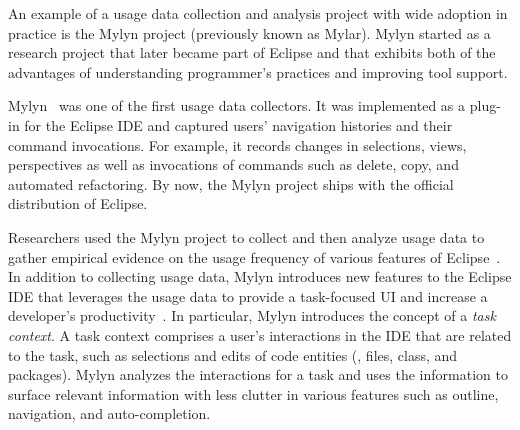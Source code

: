 An example of a usage data collection and analysis project with wide adoption
in practice is the Mylyn project (previously known as Mylar). Mylyn started as a research project that later became part of Eclipse and that exhibits both of the advantages of understanding programmer's practices and improving tool support.

Mylyn~\cite{V:Murphy2006How} was one of the first usage data collectors. It was
implemented as a plug-in for the Eclipse IDE and captured users' navigation
histories and their command invocations. For example, it records changes in
selections, views, perspectives as well as invocations of commands such as
delete, copy, and automated refactoring. By now, the Mylyn project ships with the official distribution of Eclipse.

Researchers used the Mylyn project to collect and then analyze usage data to gather empirical evidence on the usage frequency of various features of Eclipse~\cite{V:Murphy2006How}. In addition to collecting usage data, Mylyn introduces new features to the Eclipse
IDE that leverages the usage data to provide a task-focused UI and increase a developer's productivity~\cite{Kersten-Mylin}. In particular, Mylyn introduces the concept of a \emph{task context}. A task context comprises a user's interactions in the IDE that are related to the task, such as selections and edits of code entities (\eg, files, class, and packages). Mylyn analyzes the interactions for a task and uses the information to surface relevant information with less clutter in various features such as outline, navigation, and auto-completion.

%



